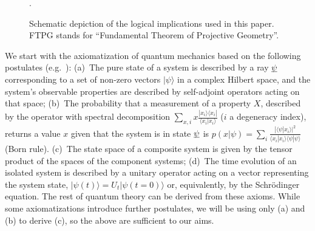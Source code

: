 \documentclass[aps,prl,amsmath,amssymb,twocolumn]{revtex4}
\theoremstyle{plain}
\theoremstyle{definition}
\theoremstyle{remark}
\newcommand{\pj}[1] {\underbar{$#1$}}
\def\>{\rangle}
\def\<{\langle}
\def\commentg#1{ [{\bf Comment Gabriele:} {\sf #1}]}
\def\togli#1{}
\begin{document}
\begin{figure}[ht]
  .\hsize\leavevmode{}
  \caption{Schematic depiction of the logical implications used in
    this paper. FTPG stands for ``Fundamental Theorem of Projective
    Geometry''.  \label{f:fig}}\end{figure}
	
We start with the axiomatization of quantum mechanics based on the
following postulates
(e.g.~\cite{ozawa,masanes,wootters,nielsenchuang}): (a)~The pure state
of a system is described by a ray $\pj{\psi}$ corresponding to a set
of non-zero vectors $|\psi\>$ in a complex Hilbert space, and the
system's observable properties are described by self-adjoint operators
acting on that space; (b)~The probability that a measurement of a
property $X$, described by the operator with spectral decomposition
$\sum_{x,i}x\frac{|x_i\>\<x_i|}{\<x_i|x_i\>}$ ($i$ a degeneracy index),
returns a value $x$ given that the system is in state $\pj{\psi}$ is
$p(x|\psi)=\sum_i\frac{|\<\psi|x_i\>|^2}{\<x_i|x_i\>\<\psi|\psi\>}$ (Born
rule). (c)~The state space of a composite system is given by the
tensor product of the spaces of the component systems; (d)~The time
evolution of an isolated system is described by a unitary operator
acting on a vector representing the system state,
$|\psi({t})\>=U_{t}|\psi({t}=0)\>$ or, equivalently, by the
Schr\"odinger equation. The rest of quantum theory can be derived from
these axioms. While some axiomatizations introduce further postulates,
we will be using only (a) and (b) to derive (c), so the above are
sufficient to our aims.
	
\togli{This axiomatization implicitly contains a definition of
  ``quantum system'' which is crucial for what follows, so we need to
  clarify the assumptions that it contains. We will use the following
  definition for a quantum
  system\togli{$\stackon[1pt]={\mbox{\tiny
        def}}$}$\stackrel{\mbox{\tiny def}}=${\em ``a quantum degree
    of freedom with $d$ (possibly discrete, or continuous, infinite)
    mutually exclusive (commuting) values for each of its properties.
    Its mathematical description is through a Hilbert space of
    dimension $d$ which contains all the states that describe the
    values of its possible properties. In accordance with the
    postulate (a), these values correspond to a basis of the space,
    given by the eigenvectors of the observable corresponding to that
    property''}. \commentg{We may have to revise to be more clear.
    Where is this used?} }
	
\end{document}
